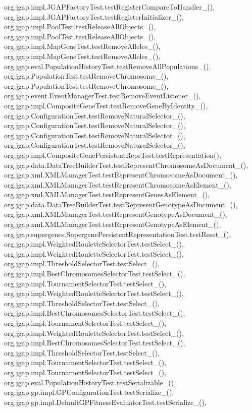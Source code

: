 org.\-jgap.\-impl.\-J\-G\-A\-P\-Factory\-Test.\-test\-Register\-Compare\-To\-Handler\-\_(), org.\-jgap.\-impl.\-J\-G\-A\-P\-Factory\-Test.\-test\-Register\-Initializer\-\_(), org.\-jgap.\-impl.\-Pool\-Test.\-test\-Release\-All\-Objects\-\_(), org.\-jgap.\-impl.\-Pool\-Test.\-test\-Release\-All\-Objects\-\_(), org.\-jgap.\-impl.\-Map\-Gene\-Test.\-test\-Remove\-Alleles\-\_(), org.\-jgap.\-impl.\-Map\-Gene\-Test.\-test\-Remove\-Alleles\-\_(), org.\-jgap.\-eval.\-Population\-History\-Test.\-test\-Remove\-All\-Populations\-\_(), org.\-jgap.\-Population\-Test.\-test\-Remove\-Chromosome\-\_(), org.\-jgap.\-Population\-Test.\-test\-Remove\-Chromosome\-\_(), org.\-jgap.\-event.\-Event\-Manager\-Test.\-test\-Remove\-Event\-Listener\-\_(), org.\-jgap.\-impl.\-Composite\-Gene\-Test.\-test\-Remove\-Gene\-By\-Identity\-\_(), org.\-jgap.\-Configuration\-Test.\-test\-Remove\-Natural\-Selector\-\_(), org.\-jgap.\-Configuration\-Test.\-test\-Remove\-Natural\-Selector\-\_(), org.\-jgap.\-Configuration\-Test.\-test\-Remove\-Natural\-Selector\-\_(), org.\-jgap.\-Configuration\-Test.\-test\-Remove\-Natural\-Selector\-\_(), org.\-jgap.\-impl.\-Composite\-Gene\-Persistent\-Repr\-Test.\-test\-Representation(), org.\-jgap.\-data.\-Data\-Tree\-Builder\-Test.\-test\-Represent\-Chromosome\-As\-Document\-\_(), org.\-jgap.\-xml.\-X\-M\-L\-Manager\-Test.\-test\-Represent\-Chromosome\-As\-Document\-\_(), org.\-jgap.\-xml.\-X\-M\-L\-Manager\-Test.\-test\-Represent\-Chromosome\-As\-Element\-\_(), org.\-jgap.\-xml.\-X\-M\-L\-Manager\-Test.\-test\-Represent\-Genes\-As\-Element\-\_(), org.\-jgap.\-data.\-Data\-Tree\-Builder\-Test.\-test\-Represent\-Genotype\-As\-Document\-\_(), org.\-jgap.\-xml.\-X\-M\-L\-Manager\-Test.\-test\-Represent\-Genotype\-As\-Document\-\_(), org.\-jgap.\-xml.\-X\-M\-L\-Manager\-Test.\-test\-Represent\-Genotype\-As\-Element\-\_(), org.\-jgap.\-supergenes.\-Supergene\-Persistent\-Representation\-Test.\-test\-Reset\-\_(), org.\-jgap.\-impl.\-Weighted\-Roulette\-Selector\-Test.\-test\-Select\-\_(), org.\-jgap.\-impl.\-Weighted\-Roulette\-Selector\-Test.\-test\-Select\-\_(), org.\-jgap.\-impl.\-Threshold\-Selector\-Test.\-test\-Select\-\_(), org.\-jgap.\-impl.\-Best\-Chromosomes\-Selector\-Test.\-test\-Select\-\_(), org.\-jgap.\-impl.\-Tournament\-Selector\-Test.\-test\-Select\-\_(), org.\-jgap.\-impl.\-Weighted\-Roulette\-Selector\-Test.\-test\-Select\-\_(), org.\-jgap.\-impl.\-Threshold\-Selector\-Test.\-test\-Select\-\_(), org.\-jgap.\-impl.\-Best\-Chromosomes\-Selector\-Test.\-test\-Select\-\_(), org.\-jgap.\-impl.\-Tournament\-Selector\-Test.\-test\-Select\-\_(), org.\-jgap.\-impl.\-Weighted\-Roulette\-Selector\-Test.\-test\-Select\-\_(), org.\-jgap.\-impl.\-Best\-Chromosomes\-Selector\-Test.\-test\-Select\-\_(), org.\-jgap.\-impl.\-Threshold\-Selector\-Test.\-test\-Select\-\_(), org.\-jgap.\-impl.\-Tournament\-Selector\-Test.\-test\-Select\-\_(), org.\-jgap.\-impl.\-Tournament\-Selector\-Test.\-test\-Select\-\_(), org.\-jgap.\-eval.\-Population\-History\-Test.\-test\-Serializable\-\_(), org.\-jgap.\-gp.\-impl.\-G\-P\-Configuration\-Test.\-test\-Serialize\-\_(), org.\-jgap.\-gp.\-impl.\-Default\-G\-P\-Fitness\-Evaluator\-Test.\-test\-Serialize\-\_(), 